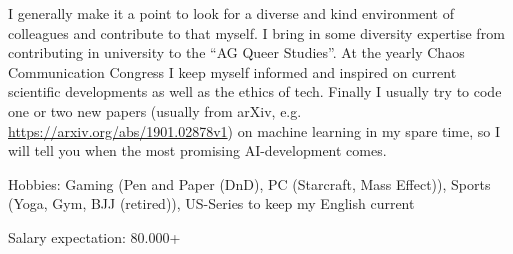 \documentclass[a4paper]{twentysecondcv} %
\begin{document}
I generally make it a point to look for a diverse and kind environment of colleagues and 
contribute to that myself. I bring in some diversity expertise from contributing in university
to the ``AG Queer Studies''. At the yearly Chaos Communication Congress I keep 
myself informed and inspired on current scientific developments as well as the ethics of tech. 
Finally I usually try to code one or two new papers 
(usually from arXiv, e.g. \href{https://arxiv.org/abs/1901.02878v1}{https://arxiv.org/abs/1901.02878v1}) on machine 
learning in my spare time, so I will tell you when the most promising AI-development comes.

Hobbies: Gaming (Pen and Paper (DnD), PC (Starcraft, Mass Effect)), 
Sports (Yoga, Gym, BJJ (retired)), US-Series to keep my English current

Salary expectation: 80.000\EUR+
\end{document}
